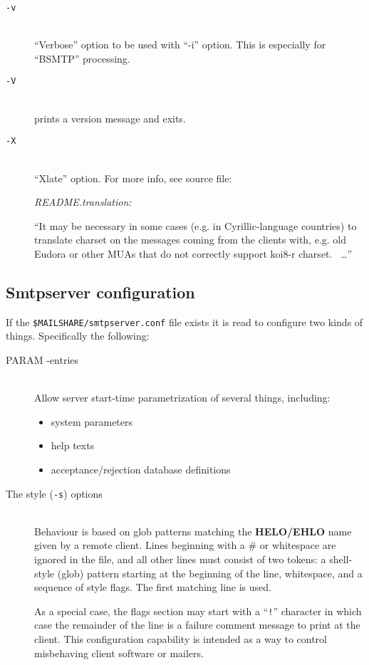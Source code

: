 \begin{description}
\item[\tt -v] \mbox{} \\
``Verbose'' option to be used with ``-i'' option.
This is especially for ``BSMTP'' processing.

\item[\tt -V] \mbox{} \\
prints a version message and exits.

\item[\tt -X] \mbox{} \\
``Xlate'' option.  For more info, see source file:
{\em README.translation:

``It may be necessary in some cases (e.g. in Cyrillic-language countries)
to translate charset on the messages coming from the clients with, e.g.
old Eudora or other MUAs that do not correctly support koi8-r charset.
\ \ldots''
}

\end{description}



\subsection{Smtpserver configuration}


If the {\tt \$MAILSHARE/smtpserver.conf} file exists it is read 
to configure two kinds of things. Specifically the following:

\begin{description}
\item[\rm PARAM -entries] \mbox{} \\
Allow server start-time parametrization of several things, including:

\begin{itemize}
\item  system parameters
\item  help texts
\item  acceptance/rejection database definitions
\end{itemize}

\item[\rm The style ({\tt -s}) options] \mbox{} \\
Behaviour is based on glob patterns matching the {\bf HELO/EHLO} name given
by a remote client.
Lines beginning with a \# or whitespace are ignored in the file, and all other
lines must consist of two tokens:
a shell-style (glob) pattern starting at the beginning of the line,
whitespace, and a sequence of style flags.
The first matching line is used.

As a special case, the flags section may start with a ``{\tt !}'' character
in which case the remainder of the line is a failure comment message to print
at the client.
This configuration capability is intended as a way to control misbehaving
client software or mailers.
\end{description}

